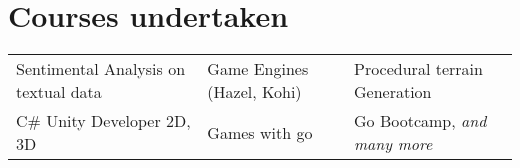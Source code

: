 \documentclass[a4paper,10pt]{article}
\begin{document}
\section{Courses undertaken}
\begin{tabular}{p{}p{}p{}}
    {Sentimental Analysis on textual data}&{Game Engines (Hazel, Kohi)}&{Procedural terrain Generation}\\
    {C\# Unity Developer 2D, 3D}&{Games with go}&{Go Bootcamp, \textit{and many more}}\\
\end{tabular}
\end{document}
